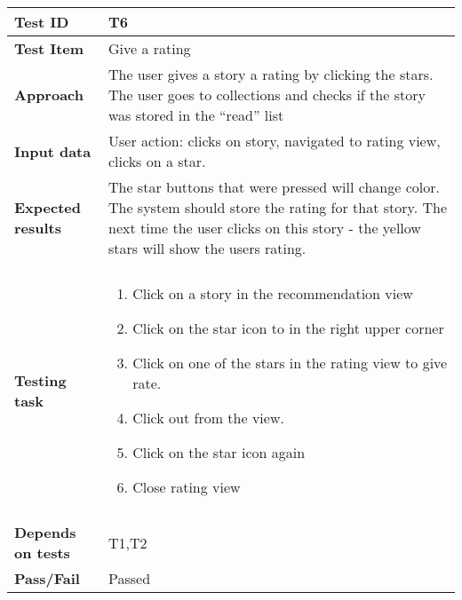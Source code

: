 \begin{appendices}
\begin{table}[H]
	\label{Tab:systemTesting5}
	\end{table}
	


	\begin{table}[H]
		\centering
		\begin{tabular}{ | l | l  |}
			\hline
			\textbf{Test ID} & T6  \\ \hline
			\textbf{Test Item} & Give a rating \\ \hline
			\textbf{Approach} & \begin{minipage}{5in}The user gives a story a rating by clicking the stars. The user goes to collections and checks if the story was stored in the “read” list \end{minipage}\\ \hline
			\textbf{Input data} &  \begin{minipage}{5in}User action: clicks on story, navigated to rating view, clicks on a star. \end{minipage}\\ \hline
			\textbf{Expected results} & \begin{minipage}{5in}The star buttons that were pressed will change color.  The system should store the rating for that story. The next time the user clicks on this story - the yellow stars will show the users rating.  \end{minipage}\\ \hline&\\[-3.8ex]
			\textbf{Testing task} & \begin{minipage}{5in}
			\begin{enumerate}[noitemsep]
			\item Click on a story in the recommendation view
			\item Click on the star icon to in the right upper corner
			\item Click on one of the stars in the rating view to give rate.
			\item Click out from the view. 
			\item Click on the star icon again
			\item Close rating view
			\end{enumerate}\end{minipage}
			\\ &\\[-3.8ex]\hline
			\textbf{Depends on tests} & T1,T2 \\ \hline		
			\textbf{Pass/Fail} & Passed \\\hline			
		\end{tabular}


\end{table}
\end{appendices}
